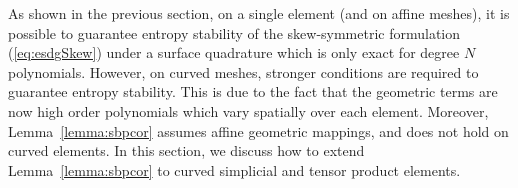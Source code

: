 \documentclass{svjour3}                     %
\renewcommand{\tilde}{\widetilde}
\newcommand{\diag}[1]{{\rm diag}\LRp{#1}}
\newcommand{\pd}[2]{\frac{\partial#1}{\partial#2}}
\newcommand{\LRp}[1]{\left( #1 \right)}
\newcommand{\LRs}[1]{\left[ #1 \right]}
\renewcommand{\note}[1]{{\color{blue}{#1}}}
\begin{document}
%
%
%


As shown in the previous section, on a single element (and on affine meshes), it is possible to guarantee entropy stability of the skew-symmetric formulation (\ref{eq:esdgSkew}) under a surface quadrature which is only exact for degree $N$ polynomials.  However, on curved meshes, stronger conditions are required to guarantee entropy stability.  This is due to the fact that the geometric terms are now high order polynomials which vary spatially over each element.  Moreover, Lemma~\ref{lemma:sbpcor} assumes affine geometric mappings, and does not hold on curved elements.  In this section, we discuss how to extend Lemma~\ref{lemma:sbpcor} to curved simplicial and tensor product elements.  
\end{document}
